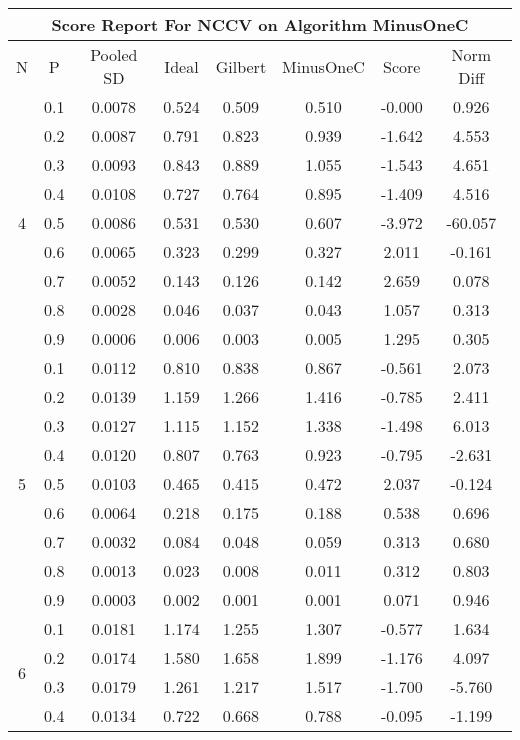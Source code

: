 \documentclass[11pt,a4paper]{report}
\begin{document}
\begin{longtable}{ | c | c || c | c | c | c | c | c | }
\hline
\multicolumn{8}{|c|}{ Score Report For NCCV on Algorithm MinusOneC} \\
\hline
N & P & Pooled SD &  Ideal &  Gilbert & MinusOneC  & Score & Norm Diff \\
 \hline
 \hline
 \endhead
\multirow{9}{*}{4} & 0.1 & 0.0078 & 0.524 & 0.509 & 0.510 & -0.000 & 0.926 \\
 & 0.2 & 0.0087 & 0.791 & 0.823 & 0.939 & -1.642 & 4.553 \\
 & 0.3 & 0.0093 & 0.843 & 0.889 & 1.055 & -1.543 & 4.651 \\
 & 0.4 & 0.0108 & 0.727 & 0.764 & 0.895 & -1.409 & 4.516 \\
 & 0.5 & 0.0086 & 0.531 & 0.530 & 0.607 & -3.972 & -60.057 \\
 & 0.6 & 0.0065 & 0.323 & 0.299 & 0.327 & 2.011 & -0.161 \\
 & 0.7 & 0.0052 & 0.143 & 0.126 & 0.142 & 2.659 & 0.078 \\
 & 0.8 & 0.0028 & 0.046 & 0.037 & 0.043 & 1.057 & 0.313 \\
 & 0.9 & 0.0006 & 0.006 & 0.003 & 0.005 & 1.295 & 0.305 \\
 \hline
\multirow{9}{*}{5} & 0.1 & 0.0112 & 0.810 & 0.838 & 0.867 & -0.561 & 2.073 \\
 & 0.2 & 0.0139 & 1.159 & 1.266 & 1.416 & -0.785 & 2.411 \\
 & 0.3 & 0.0127 & 1.115 & 1.152 & 1.338 & -1.498 & 6.013 \\
 & 0.4 & 0.0120 & 0.807 & 0.763 & 0.923 & -0.795 & -2.631 \\
 & 0.5 & 0.0103 & 0.465 & 0.415 & 0.472 & 2.037 & -0.124 \\
 & 0.6 & 0.0064 & 0.218 & 0.175 & 0.188 & 0.538 & 0.696 \\
 & 0.7 & 0.0032 & 0.084 & 0.048 & 0.059 & 0.313 & 0.680 \\
 & 0.8 & 0.0013 & 0.023 & 0.008 & 0.011 & 0.312 & 0.803 \\
 & 0.9 & 0.0003 & 0.002 & 0.001 & 0.001 & 0.071 & 0.946 \\
 \hline
\multirow{9}{*}{6} & 0.1 & 0.0181 & 1.174 & 1.255 & 1.307 & -0.577 & 1.634 \\
 & 0.2 & 0.0174 & 1.580 & 1.658 & 1.899 & -1.176 & 4.097 \\
 & 0.3 & 0.0179 & 1.261 & 1.217 & 1.517 & -1.700 & -5.760 \\
 & 0.4 & 0.0134 & 0.722 & 0.668 & 0.788 & -0.095 & -1.199 \\

\end{longtable}
\end{document}
